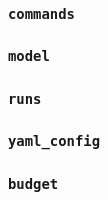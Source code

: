 \subsubsection{\texttt{commands}}




\subsubsection{\texttt{model}}




\subsubsection{\texttt{runs}}




\subsubsection{\texttt{yaml\_config}}




\subsubsection{\texttt{budget}}
